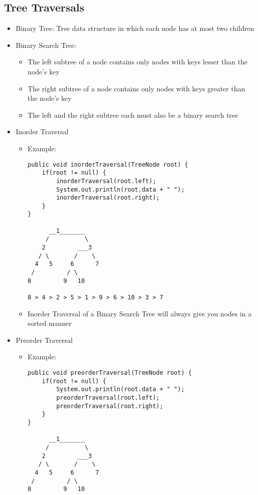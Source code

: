\documentclass[a4paper, 11.25pt]{article}
\begin{document}
\subsection{Tree Traversals}
\begin{itemize}
    \item Binary Tree: Tree data structure in which each node has at most two children
    \item Binary Search Tree:
    \begin{itemize}
        \item The left subtree of a node contains only nodes with keys lesser than the node's key
        \item The right subtree of a node contains only nodes with keys greater than the node's key
        \item The left and the right subtree each must also be a binary search tree
    \end{itemize}
    \item Inorder Traversal
    \begin{itemize}
        \item Example:
        \begin{lstlisting}[style=CStyle]
public void inorderTraversal(TreeNode root) {
    if(root != null) {
        inorderTraversal(root.left);
        System.out.println(root.data + " ");
        inorderTraversal(root.right);
    }
}
    
      __1_______
     /          \
    2         ___3
   / \       /    \
  4   5     6      7
 /         / \
8         9   10

8 > 4 > 2 > 5 > 1 > 9 > 6 > 10 > 3 > 7\end{lstlisting}
        \item Inorder Traversal of a Binary Search Tree will always give you nodes in a sorted manner
    \end{itemize}
    \item Preorder Traversal
        \begin{itemize}
        \item Example:
        \begin{lstlisting}[style=CStyle]
public void preorderTraversal(TreeNode root) {
    if(root != null) {
        System.out.println(root.data + " ");
        preorderTraversal(root.left);
        preorderTraversal(root.right);
    }
}
    
      __1_______
     /          \
    2         ___3
   / \       /    \
  4   5     6      7
 /         / \
8         9   10


\end{lstlisting}
\end{itemize}
\end{itemize}
\end{document}

